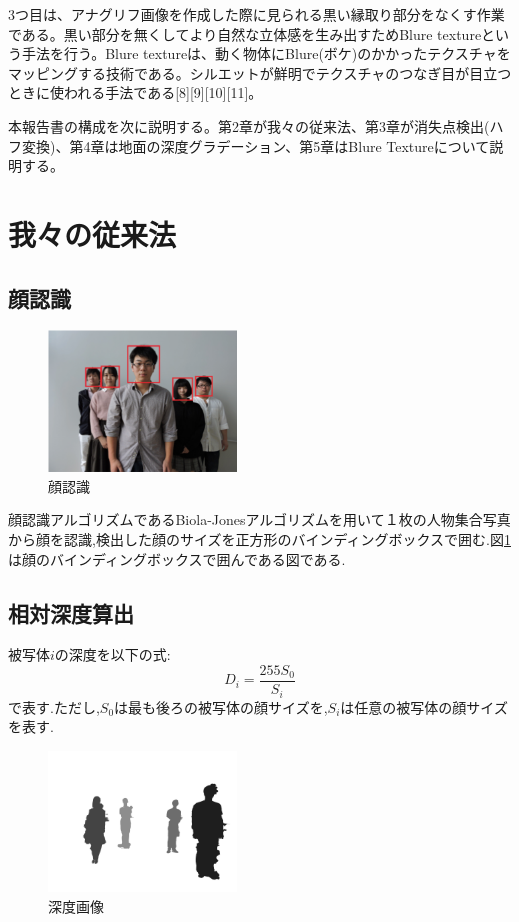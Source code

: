 \documentclass[technicalreport]{ieicej}
\begin{document}
3つ目は、アナグリフ画像を作成した際に見られる黒い縁取り部分をなくす作業である。黒い部分を無くしてより自然な立体感を生み出すためBlure textureという手法を行う。Blure textureは、動く物体にBlure(ボケ)のかかったテクスチャをマッピングする技術である。シルエットが鮮明でテクスチャのつなぎ目が目立つときに使われる手法である[8][9][10][11]。

本報告書の構成を次に説明する。第2章が我々の従来法、第3章が消失点検出(ハフ変換)、第4章は地面の深度グラデーション、第5章はBlure Textureについて説明する。
\section{我々の従来法}
\subsection{顔認識}
\begin{figure}[t]
\begin{center}
\includegraphics[width=5cm,bb=0 0 570 428]{fig1.png}
\caption{顔認識}
\label{fig:1}
\end{center}
\end{figure}
顔認識アルゴリズムであるBiola-Jonesアルゴリズムを用いて１枚の人物集合写真から顔を認識,検出した顔のサイズを正方形のバインディングボックスで囲む.図\ref{fig:1}は顔のバインディングボックスで囲んである図である.

\subsection{相対深度算出}
被写体$i$の深度を以下の式:\begin{equation}D_i=\frac{255S_0}{S_i}\end{equation}で表す.ただし,$S_0$は最も後ろの被写体の顔サイズを,$S_i$は任意の被写体の顔サイズを表す.
\begin{figure}[t]
\begin{center}
\includegraphics[width=5cm,bb=0 0 4608 3456]{depth.jpg}
\caption{深度画像}
\label{fig:2}
\end{center}
\end{figure}
\end{document}
